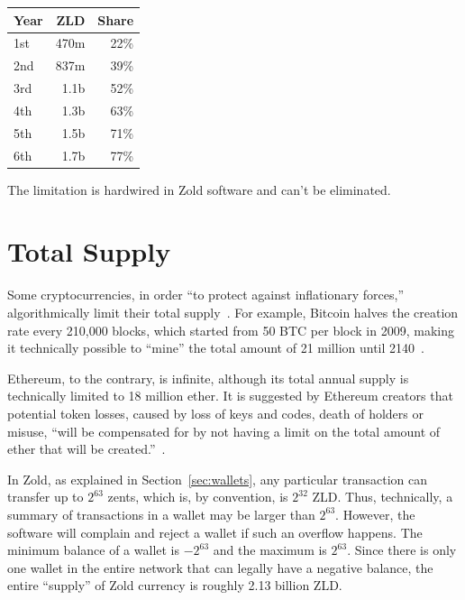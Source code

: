 \documentclass[11pt,oneside]{article}
\begin{document}
\vspace{\parskip}\begin{center}\begin{tabular}{lrr}
\hline
Year & ZLD & Share \\
\hline
1st & 470m & 22\% \\
2nd & 837m & 39\% \\
3rd & 1.1b & 52\%\\
4th & 1.3b & 63\% \\
5th & 1.5b & 71\% \\
6th & 1.7b & 77\% \\
\hline
\end{tabular}\end{center}

The limitation is hardwired in Zold software and can't be eliminated.

\section{Total Supply}\label{sec:supply}

Some cryptocurrencies, in order ``to protect against inflationary forces,''
algorithmically limit their total supply~\parencite{bohr2014}.
For example, Bitcoin halves the creation rate every 210,000 blocks,
which started from 50 BTC per block in 2009,
making it technically possible to ``mine'' the total amount
of 21 million until 2140~\parencite{iwamura2014}.

Ethereum, to the contrary, is infinite, although its total annual
supply is technically limited to 18 million ether. It is suggested
by Ethereum creators that potential token losses, caused by loss of keys and codes, death
of holders or misuse, ``will be compensated for by not having
a limit on the total amount of ether that will be created.''~\parencite{fekkes2018}.

In Zold, as explained in Section~\ref{sec:wallets}, any particular transaction can
transfer up to $2^{63}$ zents, which is, by convention, is $2^{32}$ ZLD.
Thus, technically, a summary of transactions in a wallet may be larger
than $2^{63}$. However, the software will complain and reject a wallet
if such an overflow happens. The minimum balance of a wallet is $-2^{63}$
and the maximum is $2^{63}$. Since there is only one wallet in the entire
network that can legally have a negative balance, the entire ``supply''
of Zold currency is roughly 2.13 billion ZLD.
\end{document}
